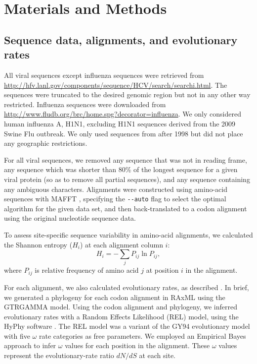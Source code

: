 \documentclass[smallextended]{svjour3}
\begin{document}
\section*{Materials and Methods}

\subsection*{Sequence data, alignments, and evolutionary rates}

All viral sequences except influenza sequences were retrieved from \url{http://hfv.lanl.gov/components/sequence/HCV/search/searchi.html}.
The sequences were truncated to the desired genomic region but not in any other way restricted. Influenza sequences were downloaded from \url{http://www.fludb.org/brc/home.spg?decorator=influenza}. We only considered human influenza A, H1N1, excluding H1N1 sequences derived from the 2009 Swine Flu outbreak. We only used sequences from after 1998 but did not place any geographic restrictions.

For all viral sequences, we removed any sequence that was not in reading frame, any sequence which was shorter than 80\% of the longest sequence for a given viral protein (so as to remove all partial sequences), and any sequence containing any ambiguous characters. Alignments were constructed using amino-acid sequences with MAFFT \citep{Katohetal2002,Katohetal2005}, specifying the \verb+--auto+ flag to select the optimal algorithm for the given data set, and then back-translated to a codon alignment using the original nucleotide sequence data.

To assess site-specific sequence variability in amino-acid alignments, we calculated the Shannon entropy ($H_i$) at each alignment column $i$:
\begin{equation}
        H_i = - \sum_jP_{ij}\ln P_{ij},
\end{equation}
where $P_{ij}$ is relative frequency of amino acid $j$ at position $i$ in the alignment.

For each alignment, we also calculated evolutionary rates, as described \citep{SpielmanWilke2013}. In brief, we generated a phylogeny for each codon alignment in RAxML \citep{RaxMLHPC} using the GTRGAMMA model. Using the codon alignment and phylogeny, we inferred evolutionary rates with a Random Effects Likelihood (REL) model, using the HyPhy software \citep{KosakovskyPondetal2005}. The REL model was a variant of the GY94 evolutionary model \citep{GoldmanYang1994} with five $\omega$ rate categories as free parameters.  We employed an Empirical Bayes approach \citep{Yang2000} to infer $\omega$ values for each position in the alignment. These $\omega$ values represent the evolutionary-rate ratio $dN/dS$ at each site.
\end{document}
